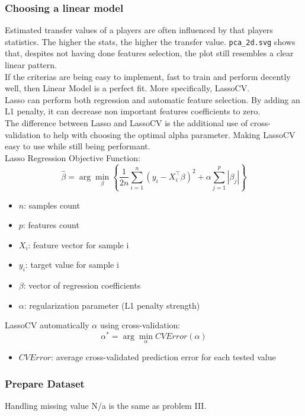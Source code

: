 \documentclass{report}
\begin{document}
\subsubsection{Choosing a linear model}
Estimated transfer values of a players are often influenced by that players statistics. The higher
the stats, the higher the transfer value. \verb|pca_2d.svg| shows that, despites not having done
features selection, the plot still resembles a clear linear pattern. \\

If the criterias are being easy to implement, fast to train and perform decently well, then 
Linear Model is a perfect fit. More specifically, LassoCV. \\

Lasso can perform both regression and automatic feature selection. By adding an L1 penalty, 
it can decrease non important features coefficients to zero. \\

The difference between Lasso and LassoCV is the additional use of cross-validation to help with 
choosing the optimal alpha parameter. Making LassoCV easy to use while still being performant. \\

Lasso Regression Objective Function:
\[  %
    \hat{\beta} = \arg\min_{\beta} \left\{ \frac{1}{2n} \sum_{i=1}^{n} 
    (y_i - X_i^{\top} \beta)^2 + \alpha \sum_{j=1}^{p} |\beta_j| \right\}
\]
\begin{itemize}
    \item \( n \): samples count
    \item \( p \): features count
    \item \( X_i \): feature vector for sample i
    \item \( y_i \): target value for sample i
    \item \( \beta \): vector of regression coefficients
    \item \( \alpha \): regularization parameter (L1 penalty strength)
\end{itemize}

LassoCV automatically $\alpha$ using cross-validation:
\[ \alpha^* = \arg\min_{\alpha} CVError(\alpha) \]
\begin{itemize}
    \item \( CVError \): average cross-validated prediction error for each tested value
\end{itemize}

\subsubsection{Prepare Dataset}
Handling missing value N/a is the same as problem III. \\
\end{document}
